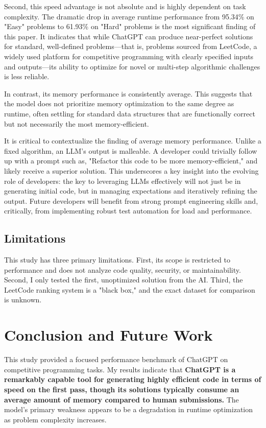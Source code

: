 \documentclass[12pt, a4paper]{article}
\begin{document}
Second, this speed advantage is not absolute and is highly dependent on task complexity. The dramatic drop in average runtime performance from 95.34\% on "Easy" problems to 61.93\% on "Hard" problems is the most significant finding of this paper. It indicates that while ChatGPT can produce near-perfect solutions for standard, well-defined problems---that is, problems sourced from LeetCode, a widely used platform for competitive programming with clearly specified inputs and outputs---its ability to optimize for novel or multi-step algorithmic challenges is less reliable.

In contrast, its memory performance is consistently average. This suggests that the model does not prioritize memory optimization to the same degree as runtime, often settling for standard data structures that are functionally correct but not necessarily the most memory-efficient.

It is critical to contextualize the finding of average memory performance. Unlike a fixed algorithm, an LLM's output is malleable. A developer could trivially follow up with a prompt such as, "Refactor this code to be more memory-efficient," and likely receive a superior solution. This underscores a key insight into the evolving role of developers: the key to leveraging LLMs effectively will not just be in generating initial code, but in managing expectations and iteratively refining the output. Future developers will benefit from strong prompt engineering skills and, critically, from implementing robust test automation for load and performance.

\subsection{Limitations}
This study has three primary limitations. First, its scope is restricted to performance and does not analyze code quality, security, or maintainability. Second, I only tested the first, unoptimized solution from the AI. Third, the LeetCode ranking system is a "black box," and the exact dataset for comparison is unknown.

\section{Conclusion and Future Work}

This study provided a focused performance benchmark of ChatGPT on competitive programming tasks. My results indicate that \textbf{ChatGPT is a remarkably capable tool for generating highly efficient code in terms of speed on the first pass, though its solutions typically consume an average amount of memory compared to human submissions.} The model's primary weakness appears to be a degradation in runtime optimization as problem complexity increases.
\end{document}
